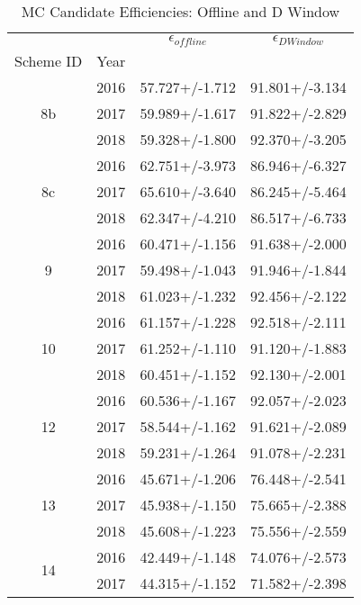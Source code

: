 \begin{table}
\centering
\caption{MC Candidate Efficiencies: Offline and D Window}
\label{tab:can_offdwin_2}
\begin{tabular}{cccc}
\toprule
   &      & $\epsilon_{offline}$ & $\epsilon_{D Window}$ \\
Scheme ID & Year &                      &                       \\
\midrule
\multirow{3}{*}{8b} & 2016 &       57.727+/-1.712 &        91.801+/-3.134 \\
   & 2017 &       59.989+/-1.617 &        91.822+/-2.829 \\
   & 2018 &       59.328+/-1.800 &        92.370+/-3.205 \\
\cline{1-4}
\multirow{3}{*}{8c} & 2016 &       62.751+/-3.973 &        86.946+/-6.327 \\
   & 2017 &       65.610+/-3.640 &        86.245+/-5.464 \\
   & 2018 &       62.347+/-4.210 &        86.517+/-6.733 \\
\cline{1-4}
\multirow{3}{*}{9} & 2016 &       60.471+/-1.156 &        91.638+/-2.000 \\
   & 2017 &       59.498+/-1.043 &        91.946+/-1.844 \\
   & 2018 &       61.023+/-1.232 &        92.456+/-2.122 \\
\cline{1-4}
\multirow{3}{*}{10} & 2016 &       61.157+/-1.228 &        92.518+/-2.111 \\
   & 2017 &       61.252+/-1.110 &        91.120+/-1.883 \\
   & 2018 &       60.451+/-1.152 &        92.130+/-2.001 \\
\cline{1-4}
\multirow{3}{*}{12} & 2016 &       60.536+/-1.167 &        92.057+/-2.023 \\
   & 2017 &       58.544+/-1.162 &        91.621+/-2.089 \\
   & 2018 &       59.231+/-1.264 &        91.078+/-2.231 \\
\cline{1-4}
\multirow{3}{*}{13} & 2016 &       45.671+/-1.206 &        76.448+/-2.541 \\
   & 2017 &       45.938+/-1.150 &        75.665+/-2.388 \\
   & 2018 &       45.608+/-1.223 &        75.556+/-2.559 \\
\cline{1-4}
\multirow{3}{*}{14} & 2016 &       42.449+/-1.148 &        74.076+/-2.573 \\
   & 2017 &       44.315+/-1.152 &        71.582+/-2.398 \\

\end{tabular}
\end{table}
